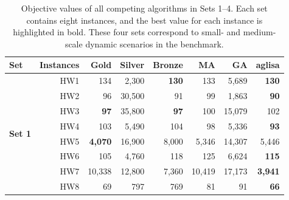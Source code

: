 \documentclass[]{interact}
\begin{document}
\begin{table}[htp]
\centering
\caption{Objective values of all competing algorithms in Sets 1--4. 
Each set contains eight instances, and the best value for each instance is highlighted in bold. 
These four sets correspond to small- and medium-scale dynamic scenarios in the benchmark.}
\begin{tabular}{l|r|r|r|r|r|r|r}
\hline
\textbf{Set}                    & \textbf{Instances} & \textbf{Gold} & \textbf{Silver} & \textbf{Bronze} & \textbf{MA}   & \textbf{GA}   & \textbf{\gls{aglisa}} \\ \hline
\multirow{8}{*}{\textbf{Set 1}} 
& HW1  & 134   & 2,300 & \textbf{130} & 133 & 5,689 & \textbf{130} \\ 
& HW2  & 96    & 30,500 & 91 & 99 & 1,863 & \textbf{90} \\ 
& HW3  & \textbf{97} & 35,800 & \textbf{97} & 100 & 15,079 & 102 \\ 
& HW4  & 103 & 5,490 & 104 & 98 & 5,336 & \textbf{93} \\ 
& HW5  & \textbf{4,070} & 16,900 & 8,000 & 5,346 & 14,307 & 5,446 \\ 
& HW6  & 105 & 4,760 & 118 & 125 & 6,624 & \textbf{115} \\ 
& HW7  & 10,338 & 12,800 & 7,360 & 10,419 & 17,173 & \textbf{3,941} \\ 
& HW8  & 69 & 797 & 769 & 81 & 91 & \textbf{66} \\ \hline


\end{tabular}
\end{table}
\end{document}
